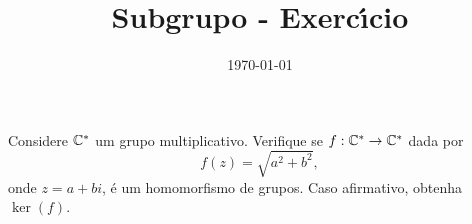 \documentclass{beamer}
\title{Subgrupo - Exerc{\'\i}cio}
\author[\autor]{\autor}
\institute[\instituto]{\instituto}
\date[]{\today}
\begin{document}


    \begin{frame}
        \begin{exercicio}
            Considere $\mathbb{C}^*$ um grupo multiplicativo. Verifique se $f : \mathbb{C}^* \to \mathbb{C}^*$ dada por 
            \[
                f(z) = \sqrt{a^2 + b^2},
            \]
            onde $z = a + bi$, \'e um homomorfismo de grupos. Caso afirmativo, obtenha $\ker(f)$.
        \end{exercicio}
    \end{frame}
\end{document}
